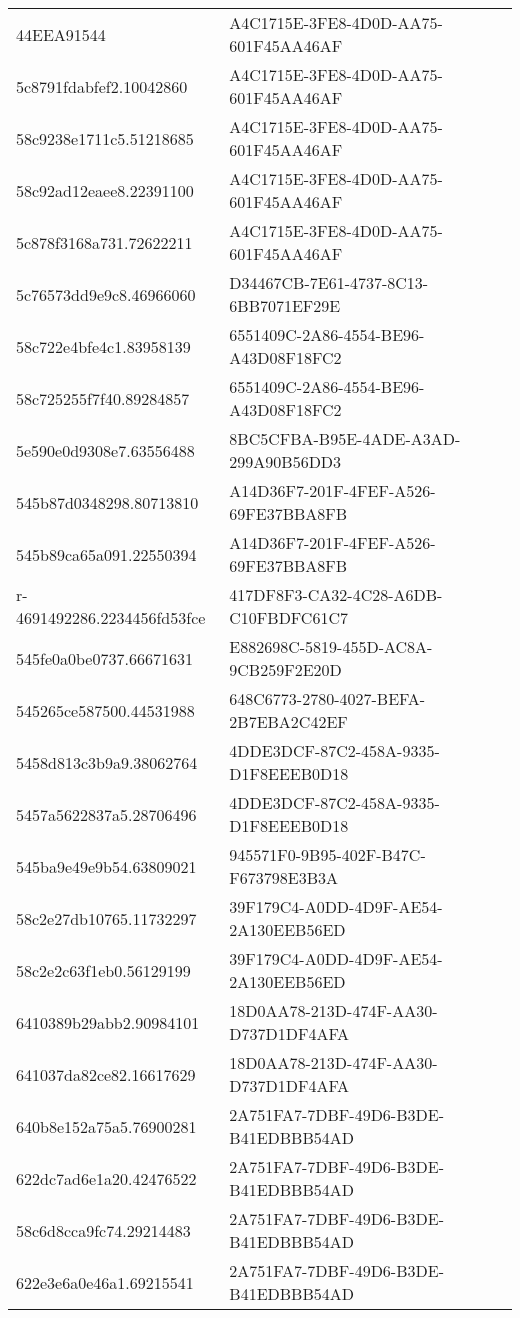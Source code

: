 \begin{tabular}{ll}
44EEA91544 & A4C1715E-3FE8-4D0D-AA75-601F45AA46AF \\
5c8791fdabfef2.10042860 & A4C1715E-3FE8-4D0D-AA75-601F45AA46AF \\
58c9238e1711c5.51218685 & A4C1715E-3FE8-4D0D-AA75-601F45AA46AF \\
58c92ad12eaee8.22391100 & A4C1715E-3FE8-4D0D-AA75-601F45AA46AF \\
5c878f3168a731.72622211 & A4C1715E-3FE8-4D0D-AA75-601F45AA46AF \\
5c76573dd9e9c8.46966060 & D34467CB-7E61-4737-8C13-6BB7071EF29E \\
58c722e4bfe4c1.83958139 & 6551409C-2A86-4554-BE96-A43D08F18FC2 \\
58c725255f7f40.89284857 & 6551409C-2A86-4554-BE96-A43D08F18FC2 \\
5e590e0d9308e7.63556488 & 8BC5CFBA-B95E-4ADE-A3AD-299A90B56DD3 \\
545b87d0348298.80713810 & A14D36F7-201F-4FEF-A526-69FE37BBA8FB \\
545b89ca65a091.22550394 & A14D36F7-201F-4FEF-A526-69FE37BBA8FB \\
r-4691492286.2234456fd53fce & 417DF8F3-CA32-4C28-A6DB-C10FBDFC61C7 \\
545fe0a0be0737.66671631 & E882698C-5819-455D-AC8A-9CB259F2E20D \\
545265ce587500.44531988 & 648C6773-2780-4027-BEFA-2B7EBA2C42EF \\
5458d813c3b9a9.38062764 & 4DDE3DCF-87C2-458A-9335-D1F8EEEB0D18 \\
5457a5622837a5.28706496 & 4DDE3DCF-87C2-458A-9335-D1F8EEEB0D18 \\
545ba9e49e9b54.63809021 & 945571F0-9B95-402F-B47C-F673798E3B3A \\
58c2e27db10765.11732297 & 39F179C4-A0DD-4D9F-AE54-2A130EEB56ED \\
58c2e2c63f1eb0.56129199 & 39F179C4-A0DD-4D9F-AE54-2A130EEB56ED \\
6410389b29abb2.90984101 & 18D0AA78-213D-474F-AA30-D737D1DF4AFA \\
641037da82ce82.16617629 & 18D0AA78-213D-474F-AA30-D737D1DF4AFA \\
640b8e152a75a5.76900281 & 2A751FA7-7DBF-49D6-B3DE-B41EDBBB54AD \\
622dc7ad6e1a20.42476522 & 2A751FA7-7DBF-49D6-B3DE-B41EDBBB54AD \\
58c6d8cca9fc74.29214483 & 2A751FA7-7DBF-49D6-B3DE-B41EDBBB54AD \\
622e3e6a0e46a1.69215541 & 2A751FA7-7DBF-49D6-B3DE-B41EDBBB54AD \\

\end{tabular}
